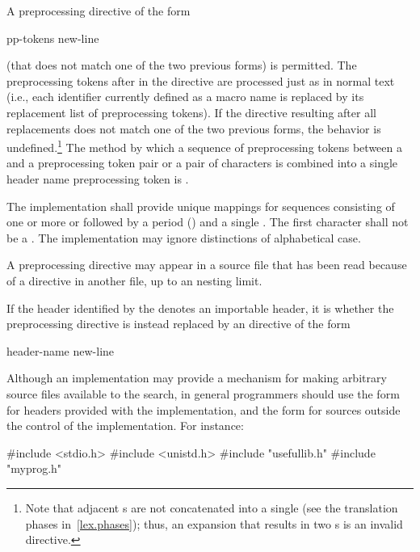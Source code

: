 \pnum
A preprocessing directive of the form
\begin{ncsimplebnf}
 pp-tokens new-line
\end{ncsimplebnf}
(that does not match one of the two previous forms) is permitted.
The preprocessing tokens after
in the directive are processed just as in normal text
(i.e., each identifier currently defined as a macro name is replaced by its
replacement list of preprocessing tokens).
If the directive resulting after all replacements does not match
one of the two previous forms, the behavior is
undefined.\footnote{Note that adjacent s are not concatenated into
a single 
(see the translation phases in~\ref{lex.phases});
thus, an expansion that results in two s is an
invalid directive.}
The method by which a sequence of preprocessing tokens between a
\tcode{<}
and a
\tcode{>}
preprocessing token pair or a pair of
characters is combined into a single header name
preprocessing token is .

\pnum
The implementation shall provide unique mappings for
sequences consisting of one or more
 or 
followed by a period
()
and a single
.
The first character shall not be a .
The implementation may ignore distinctions of alphabetical case.

\pnum
A
preprocessing directive may appear
in a source file that has been read because of a
directive in another file,
up to an  nesting limit.

\pnum
If the header identified by the 
denotes an importable header,
it is
whether the  preprocessing directive
is instead replaced by an  directive of the form
\begin{ncbnf}
 header-name \terminal{;} new-line
\end{ncbnf}

\pnum
\begin{note}
Although an implementation may provide a mechanism for making arbitrary
source files available to the \tcode{< >} search, in general
programmers should use the \tcode{< >} form for headers provided
with the implementation, and the  form for sources
outside the control of the implementation. For instance:

\begin{codeblock}
#include <stdio.h>
#include <unistd.h>
#include "usefullib.h"
#include "myprog.h"
\end{codeblock}

\end{note}

